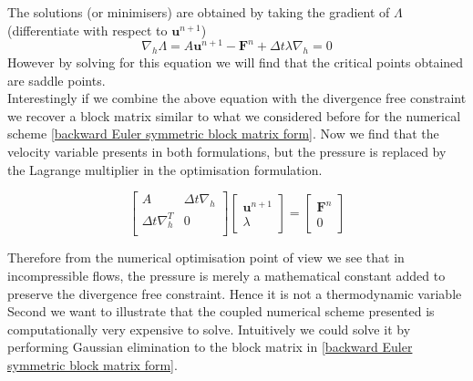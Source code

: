 The solutions (or minimisers) are obtained by taking the gradient of $\Lambda$ (differentiate with respect to $\textbf{u}^{n+1}$)
\begin{equation*}
\nabla_h \Lambda =  A\textbf{u}^{n+1} - \textbf{F}^n +  \Delta t \lambda \nabla_h = 0
\end{equation*}
However by solving for this equation we will find that the critical points obtained are saddle points.\\

Interestingly if we combine the above equation with the divergence free constraint we recover a block matrix similar to what we considered before for the numerical scheme \eqref{backward Euler symmetric block matrix form}. Now we find that the velocity variable presents in both formulations, but the pressure is replaced by the Lagrange multiplier in the optimisation formulation.

\begin{equation}\label{eq:disrecte optimisation problem in symmetric block matrix form}
\begin{bmatrix}
A & \Delta t \nabla_h\\
\Delta t \nabla_h^T & 0 \\
\end{bmatrix}
\begin{bmatrix}
\textbf{u}^{n+1}\\
\lambda
\end{bmatrix}
= \begin{bmatrix}
\textbf{F}^n\\
0
\end{bmatrix}
\end{equation}

Therefore from the numerical optimisation point of view we see that in incompressible flows, the pressure is merely a mathematical constant added to preserve the divergence free constraint. Hence it is not a thermodynamic variable
\cite{maria2003application,perot1993analysis}\\

Second we want to illustrate that the coupled numerical scheme presented is computationally very expensive to solve. Intuitively we could solve it by performing Gaussian elimination to the block matrix in \eqref{backward Euler symmetric block matrix form}. 


